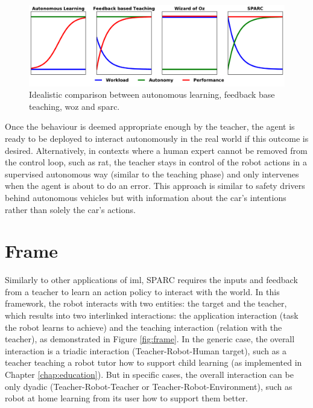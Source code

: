 \begin{figure}[ht]
	\includegraphics[width=1\linewidth]{concept.pdf}
	\centering
	\caption{Idealistic comparison between autonomous learning, feedback base teaching, \gls{woz} and \gls{sparc}.}
	\label{fig:concept}
\end{figure}

Once the behaviour is deemed appropriate enough by the teacher, the agent is ready to be deployed to interact autonomously in the real world if this outcome is desired. Alternatively, in contexts where a human expert cannot be removed from the control loop, such as \acrlong{rat}, the teacher stays in control of the robot actions in a supervised autonomous way (similar to the teaching phase) and only intervenes when the agent is about to do an error. This approach is similar to safety drivers behind autonomous vehicles but with information about the car's intentions rather than solely the car's actions. 

\section{Frame}

Similarly to other applications of \gls{iml}, SPARC requires the inputs and feedback from a teacher to learn an action policy to interact with the world. In this framework, the robot interacts with two entities: the target and the teacher, which results into two interlinked interactions: the application interaction (task the robot learns to achieve) and the teaching interaction (relation with the teacher), as demonstrated in Figure \ref{fig:frame}. In the generic case, the overall interaction is a triadic interaction (Teacher-Robot-Human target), such as a teacher teaching a robot tutor how to support child learning (as implemented in Chapter \ref{chap:education}). But in specific cases, the overall interaction can be only dyadic (Teacher-Robot-Teacher or Teacher-Robot-Environment), such as  robot at home learning from its user how to support them better.

